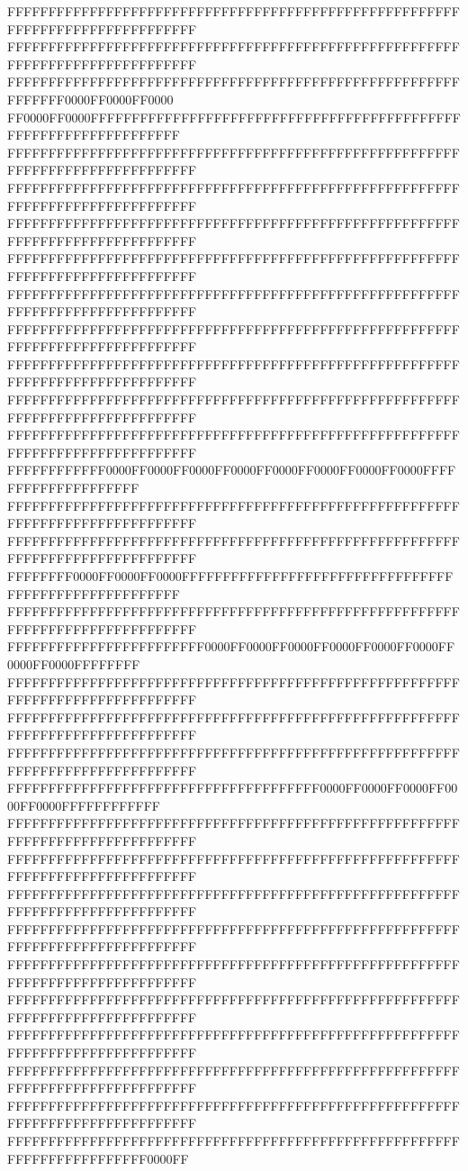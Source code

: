 FFFFFFFFFFFFFFFFFFFFFFFFFFFFFFFFFFFFFFFFFFFFFFFFFFFFFFFFFFFFFFFFFFFFFFFFFFFFFF
FFFFFFFFFFFFFFFFFFFFFFFFFFFFFFFFFFFFFFFFFFFFFFFFFFFFFFFFFFFFFFFFFFFFFFFFFFFFFF
FFFFFFFFFFFFFFFFFFFFFFFFFFFFFFFFFFFFFFFFFFFFFFFFFFFFFFFFFFFFFF0000FF0000FF0000
FF0000FF0000FFFFFFFFFFFFFFFFFFFFFFFFFFFFFFFFFFFFFFFFFFFFFFFFFFFFFFFFFFFFFFFFFF
FFFFFFFFFFFFFFFFFFFFFFFFFFFFFFFFFFFFFFFFFFFFFFFFFFFFFFFFFFFFFFFFFFFFFFFFFFFFFF
FFFFFFFFFFFFFFFFFFFFFFFFFFFFFFFFFFFFFFFFFFFFFFFFFFFFFFFFFFFFFFFFFFFFFFFFFFFFFF
FFFFFFFFFFFFFFFFFFFFFFFFFFFFFFFFFFFFFFFFFFFFFFFFFFFFFFFFFFFFFFFFFFFFFFFFFFFFFF
FFFFFFFFFFFFFFFFFFFFFFFFFFFFFFFFFFFFFFFFFFFFFFFFFFFFFFFFFFFFFFFFFFFFFFFFFFFFFF
FFFFFFFFFFFFFFFFFFFFFFFFFFFFFFFFFFFFFFFFFFFFFFFFFFFFFFFFFFFFFFFFFFFFFFFFFFFFFF
FFFFFFFFFFFFFFFFFFFFFFFFFFFFFFFFFFFFFFFFFFFFFFFFFFFFFFFFFFFFFFFFFFFFFFFFFFFFFF
FFFFFFFFFFFFFFFFFFFFFFFFFFFFFFFFFFFFFFFFFFFFFFFFFFFFFFFFFFFFFFFFFFFFFFFFFFFFFF
FFFFFFFFFFFFFFFFFFFFFFFFFFFFFFFFFFFFFFFFFFFFFFFFFFFFFFFFFFFFFFFFFFFFFFFFFFFFFF
FFFFFFFFFFFFFFFFFFFFFFFFFFFFFFFFFFFFFFFFFFFFFFFFFFFFFFFFFFFFFFFFFFFFFFFFFFFFFF
FFFFFFFFFFFF0000FF0000FF0000FF0000FF0000FF0000FF0000FF0000FFFFFFFFFFFFFFFFFFFF
FFFFFFFFFFFFFFFFFFFFFFFFFFFFFFFFFFFFFFFFFFFFFFFFFFFFFFFFFFFFFFFFFFFFFFFFFFFFFF
FFFFFFFFFFFFFFFFFFFFFFFFFFFFFFFFFFFFFFFFFFFFFFFFFFFFFFFFFFFFFFFFFFFFFFFFFFFFFF
FFFFFFFF0000FF0000FF0000FFFFFFFFFFFFFFFFFFFFFFFFFFFFFFFFFFFFFFFFFFFFFFFFFFFFFF
FFFFFFFFFFFFFFFFFFFFFFFFFFFFFFFFFFFFFFFFFFFFFFFFFFFFFFFFFFFFFFFFFFFFFFFFFFFFFF
FFFFFFFFFFFFFFFFFFFFFFFF0000FF0000FF0000FF0000FF0000FF0000FF0000FF0000FFFFFFFF
FFFFFFFFFFFFFFFFFFFFFFFFFFFFFFFFFFFFFFFFFFFFFFFFFFFFFFFFFFFFFFFFFFFFFFFFFFFFFF
FFFFFFFFFFFFFFFFFFFFFFFFFFFFFFFFFFFFFFFFFFFFFFFFFFFFFFFFFFFFFFFFFFFFFFFFFFFFFF
FFFFFFFFFFFFFFFFFFFFFFFFFFFFFFFFFFFFFFFFFFFFFFFFFFFFFFFFFFFFFFFFFFFFFFFFFFFFFF
FFFFFFFFFFFFFFFFFFFFFFFFFFFFFFFFFFFFFF0000FF0000FF0000FF0000FF0000FFFFFFFFFFFF
FFFFFFFFFFFFFFFFFFFFFFFFFFFFFFFFFFFFFFFFFFFFFFFFFFFFFFFFFFFFFFFFFFFFFFFFFFFFFF
FFFFFFFFFFFFFFFFFFFFFFFFFFFFFFFFFFFFFFFFFFFFFFFFFFFFFFFFFFFFFFFFFFFFFFFFFFFFFF
FFFFFFFFFFFFFFFFFFFFFFFFFFFFFFFFFFFFFFFFFFFFFFFFFFFFFFFFFFFFFFFFFFFFFFFFFFFFFF
FFFFFFFFFFFFFFFFFFFFFFFFFFFFFFFFFFFFFFFFFFFFFFFFFFFFFFFFFFFFFFFFFFFFFFFFFFFFFF
FFFFFFFFFFFFFFFFFFFFFFFFFFFFFFFFFFFFFFFFFFFFFFFFFFFFFFFFFFFFFFFFFFFFFFFFFFFFFF
FFFFFFFFFFFFFFFFFFFFFFFFFFFFFFFFFFFFFFFFFFFFFFFFFFFFFFFFFFFFFFFFFFFFFFFFFFFFFF
FFFFFFFFFFFFFFFFFFFFFFFFFFFFFFFFFFFFFFFFFFFFFFFFFFFFFFFFFFFFFFFFFFFFFFFFFFFFFF
FFFFFFFFFFFFFFFFFFFFFFFFFFFFFFFFFFFFFFFFFFFFFFFFFFFFFFFFFFFFFFFFFFFFFFFFFFFFFF
FFFFFFFFFFFFFFFFFFFFFFFFFFFFFFFFFFFFFFFFFFFFFFFFFFFFFFFFFFFFFFFFFFFFFFFFFFFFFF
FFFFFFFFFFFFFFFFFFFFFFFFFFFFFFFFFFFFFFFFFFFFFFFFFFFFFFFFFFFFFFFFFFFFFFFF0000FF
